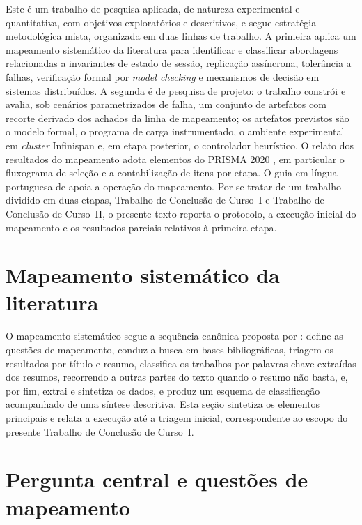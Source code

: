 
\label{sec-tipo-pesquisa}

Este é um trabalho de pesquisa aplicada, de natureza experimental e quantitativa, com objetivos exploratórios e descritivos, e segue estratégia metodológica mista, organizada em duas linhas de trabalho. A primeira aplica um mapeamento sistemático da literatura \citep{petersen_mapping_2008} para identificar e classificar abordagens relacionadas a invariantes de estado de sessão, replicação assíncrona, tolerância a falhas, verificação formal por \emph{model checking} e mecanismos de decisão em sistemas distribuídos. A segunda é de pesquisa de projeto: o trabalho constrói e avalia, sob cenários parametrizados de falha, um conjunto de artefatos com recorte derivado dos achados da linha de mapeamento; os artefatos previstos são o modelo formal, o programa de carga instrumentado, o ambiente experimental em \emph{cluster} Infinispan e, em etapa posterior, o controlador heurístico. O relato dos resultados do mapeamento adota elementos do PRISMA 2020 \citep{prisma_2020}, em particular o fluxograma de seleção e a contabilização de itens por etapa. O guia em língua portuguesa de \citet{neiva_silva_revisao_sistematica_2016} apoia a operação do mapeamento. Por se tratar de um trabalho dividido em duas etapas, Trabalho de Conclusão de Curso~I e Trabalho de Conclusão de Curso~II, o presente texto reporta o protocolo, a execução inicial do mapeamento e os resultados parciais relativos à primeira etapa. 

\section{Mapeamento sistemático da literatura}
\label{sec-ms}
\label{ap-protocolo-ms}

O mapeamento sistemático segue a sequência canônica proposta por \citet{petersen_mapping_2008}: define as questões de mapeamento, conduz a busca em bases bibliográficas, triagem os resultados por título e resumo, classifica os trabalhos por palavras-chave extraídas dos resumos, recorrendo a outras partes do texto quando o resumo não basta, e, por fim, extrai e sintetiza os dados, e produz um esquema de classificação acompanhado de uma síntese descritiva. Esta seção sintetiza os elementos principais e relata a execução até a triagem inicial, correspondente ao escopo do presente Trabalho de Conclusão de Curso~I.

\section*{Pergunta central e questões de mapeamento}
\label{ap-questoes}

